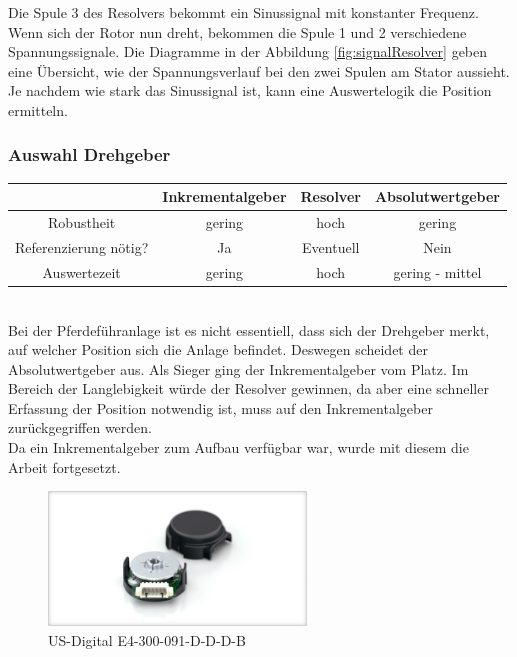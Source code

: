 Die Spule 3 des Resolvers bekommt ein Sinussignal mit konstanter Frequenz. Wenn sich der Rotor nun dreht, bekommen die Spule 1 und 2  verschiedene Spannungssignale. Die Diagramme in der Abbildung \ref{fig:signalResolver} geben eine Übersicht, wie der Spannungsverlauf bei den zwei Spulen am Stator aussieht. Je nachdem wie stark das Sinussignal ist, kann eine Auswertelogik die Position ermitteln.

\subsubsection{Auswahl Drehgeber}
\label{sec:auswahlDrehgeber}

\begin{tabular}{|c|c|c|c|}
\hline 
   & Inkrementalgeber & Resolver & Absolutwertgeber \\ 
\hline 
Robustheit & gering & hoch & gering \\ 
\hline 
Referenzierung nötig? & Ja & Eventuell & Nein \\ 
\hline 
Auswertezeit & gering & hoch & gering - mittel \\ 
\hline 
\end{tabular} \\


Bei der Pferdeführanlage ist es nicht essentiell, dass sich der Drehgeber merkt, auf welcher Position sich die Anlage befindet. Deswegen scheidet der Absolutwertgeber aus. Als Sieger ging der Inkrementalgeber vom Platz. Im Bereich der Langlebigkeit würde der Resolver gewinnen, da aber eine schneller Erfassung der Position notwendig ist, muss auf den Inkrementalgeber zurückgegriffen werden.
\\
Da ein Inkrementalgeber zum Aufbau verfügbar war, wurde mit diesem die Arbeit fortgesetzt.

\begin{figure}[H]
\begin{center}
	\caption{US-Digital E4-300-091-D-D-D-B \label{fig:drehgeberUS}}
	\includegraphics[width=0.61\textwidth]{fig/drehgeberUS}
\end{center}
\end{figure}

